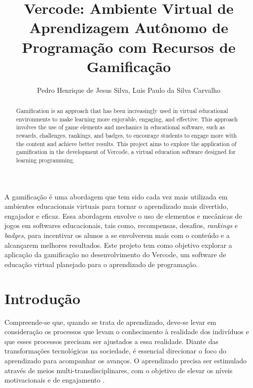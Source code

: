 \documentclass[12pt]{article}
\title{Vercode: Ambiente Virtual de Aprendizagem Autônomo de Programação com Recursos de Gamificação}
\author{Pedro Henrique de Jesus Silva\inst{1}, Luis Paulo da Silva Carvalho\inst{1}}
\begin{document}
 

\maketitle

\begin{abstract}
Gamification is an approach that has been increasingly used in virtual educational environments to make learning more enjoyable, engaging, and effective. This approach involves the use of game elements and mechanics in educational software, such as rewards, challenges, rankings, and badges, to encourage students to engage more with the content and achieve better results. This project aims to explore the application of gamification in the development of Vercode, a virtual education software designed for learning programming.
\end{abstract}
     
\begin{resumo} 
A gamificação é uma abordagem que tem sido cada vez mais utilizada em ambientes educacionais virtuais para tornar o aprendizado mais divertido, engajador e eficaz. Essa abordagem envolve o uso de elementos e mecânicas de jogos em softwares educacionais, tais como, recompensas, desafios, \textit{rankings} e \textit{badges}, para incentivar os alunos a se envolverem mais com o conteúdo e a alcançarem melhores resultados. Este projeto tem como objetivo explorar a aplicação da gamificação no desenvolvimento do Vercode, um software de educação virtual planejado para o aprendizado de programação.
\end{resumo}

\section{Introdução}

Compreende-se que, quando se trata de aprendizado, deve-se levar em consideração os processos que levam o conhecimento à realidade dos indivíduos e que esses processos precisam ser ajustados a essa realidade. Diante das transformações tecnológicas na sociedade, é essencial direcionar o foco do aprendizado para acompanhar os avanços. O aprendizado precisa ser estimulado através de meios multi-transdisciplinares, com o objetivo de elevar os níveis motivacionais e de engajamento \cite{TuncelAyva2010}.
\end{document}
